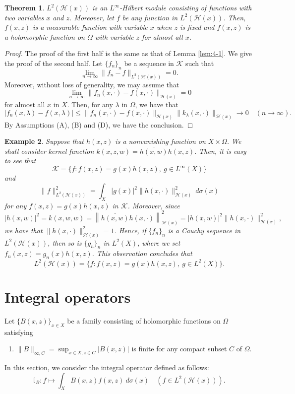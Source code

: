 \documentclass[12pt]{article}
\newtheorem{thm}{Theorem}[section]
\newtheorem{ex}[thm]{Example}
\numberwithin{equation}{section}
\newcommand{\bI}{{\mathbb I}}
\newcommand{\cH}{{\mathcal H}}
\newcommand{\cK}{{\mathcal K}}
\newcommand{\lam}{\lambda}
\begin{document}
\begin{thm}\label{thm:2-4}
$L^2(\cH(x))$ is an $L^{\infty}$-Hilbert module consisting of functions with two variables $x$ and $z$. 
Moreover, let $f$ be any function in $L^2(\cH(x))$. Then, 
$f(x,z)$ is a measurable function with variable $x$ when $z$ is fixed and 
$f(x,z)$ is a holomorphic function on $\Omega$ with variable $z$ for almost all $x$. 
\end{thm}

\begin{proof}
The proof of the first half is the same as that of Lemma \ref{lem:4-1}. 
We give the proof of the second half. 
Let $\{f_n\}_n$ be a sequence in $\cK$ such that 
\[
\lim_{n\to \infty}\|f_n-f\|_{L^2(\cH(x))}=0. 
\]   
Moreover, without loss of generality, we may assume that 
\[
\lim_{n\to \infty}\|f_n(x,\cdot)-f(x,\cdot)\|_{\cH(x)}=0
\]
for almost all $x$ in $X$.
Then, for any $\lam$ in $\Omega$, we have that
\[
|f_n(x,\lam)-f(x,\lam)|
\leq \|f_n(x,\cdot)-f(x,\cdot)\|_{\cH(x)}\|k_{\lam}(x,\cdot)\|_{\cH(x)}
\to 0\quad(n\to \infty).
\]
By Assumptions (A), (B) and (D), we have the conclusion. 
\end{proof}

\begin{ex}\label{ex:2-5}\rm 
Suppose that $h(x,z)$ is a nonvanishing function on $X\times \Omega$. 
We shall consider kernel function $k(x,z,w)=\overline{h(x,w)}h(x,z)$. Then, 
it is easy to see that 
\[
\cK=\{f:f(x,z)=g(x)h(x,z),\ g\in L^{\infty}(X)\}
\] 
and 
\[
\|f\|_{L^2(\cH(x))}^2=\int_X|g(x)|^2\|h(x,\cdot)\|_{\cH(x)}^2\ d\sigma(x)
\]
for any $f(x,z)=g(x)h(x,z)$ in $\cK$. 
Moreover, since
\[
|h(x,w)|^2=k(x,w,w)=\left\|\overline{h(x,w)}h(x,\cdot)\right\|_{\cH(x)}^2=|h(x,w)|^2\|h(x,\cdot)\|_{\cH(x)}^2, 
\]
we have that $\|h(x,\cdot)\|_{\cH(x)}^2=1$. 
Hence, if $\{f_n\}_n$ is a Cauchy sequence in $L^2(\cH(x))$, then 
so is $\{g_n\}_n$ in $L^2(X)$, where we set $f_n(x,z)=g_n(x)h(x,z)$.  
This observation concludes that 
\[
L^2(\cH(x))=\{f:f(x,z)=g(x)h(x,z),\ g \in L^2(X)\}.
\]
\end{ex}

\section{Integral operators}

Let $\{B(x,z)\}_{x\in X}$ be a family consisting of holomorphic functions on $\Omega$ satisfying
\begin{enumerate}
\item[(E)] $\|B\|_{\infty,C}=\sup_{x\in X,z \in C}|B(x,z)|$ is finite for any compact subset $C$ of $\Omega$. 
\end{enumerate}
In this section, we consider the integral operator defined as follows:
\[
\bI_B: f\mapsto \int_XB(x,z)f(x,z)\ d\sigma(x)\quad (f\in L^2(\cH(x))).
\]
\end{document}
